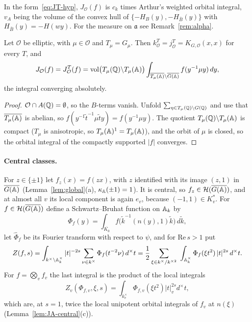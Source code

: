 In the form~\eqref{eq:JT-hyp}, $J_{\mathcal O}(f)$ is $c_k$ times Arthur's
weighted orbital integral, $v_A$ being the volume of the convex hull of
$\{-H_B(y),-H_{\bar B}(y)\}$ with $H_{\bar B}(y)=-H(wy)$. For the measure
on $\mathfrak a$ see Remark~\ref{rem:alpha}.

\begin{proposition}\label{prop:elliptic}
Let $\mathcal O$ be elliptic, with $\mu\in\mathcal O$ and $T_\mu=G_\mu$.
Then
$k^T_{\mathcal O}=j^T_{\mathcal O}=K_{G,\mathcal O}(x,x)$ for every $T$,
and
\[
J_{\mathcal O}(f)=J^T_{\mathcal O}(f)=\operatorname{vol}\bigl(T_\mu(\mathbb{Q})\backslash
T_\mu(\mathbb{A})\bigr)\int_{\overline{T_\mu(\mathbb{A})}\backslash\overline{G(\mathbb{A})}}f(y^{-1}\mu y)\,dy,
\]
the integral converging absolutely.
\end{proposition}

\begin{proof}
$\mathcal O\cap A(\mathbb{Q})=\emptyset$, so the $B$-terms vanish. Unfold
$\sum_{\eta\in T_\mu(\mathbb{Q})\backslash G(\mathbb{Q})}$ and use that
$\overline{T_\mu(\mathbb{A})}$ is abelian, so $f(y^{-1}\tilde t^{-1}\mu\tilde ty)=
f(y^{-1}\mu y)$. The quotient $T_\mu(\mathbb{Q})\backslash T_\mu(\mathbb{A})$ is compact
($T_\mu$ is anisotropic, so $T_\mu(\mathbb{A})^1=T_\mu(\mathbb{A})$), and the orbit of $\mu$ is closed, so the orbital
integral of the compactly supported $|f|$ converges.
\end{proof}

\paragraph{Central classes.} For $z\in\{\pm1\}$ let $f_z(x)=f(zx)$, with
$z$ identified with its image $(z,1)$ in $\overline{G(\mathbb{A})}$ (Lemma~\ref{lem:global}(a),
$\kappa_{\mathbb{A}}(\pm1)=1$). It is central, so $f_z\in\mathcal H(\overline{G(\mathbb{A})})$, and at
almost all $v$ its local component is again $e_v$, because $(-1,1)\in
K_v^*$. For $f\in\mathcal H(\overline{G(\mathbb{A})})$ define a Schwartz--Bruhat function on
$\mathbb{A}_k$ by
\begin{equation}\label{eq:Phi}
\Phi_f(y)=\int_{\overline{K_0}}f\bigl(\tilde k^{-1}(n(y),1)\tilde k\bigr)
\,d\tilde k,
\end{equation}
let $\hat\Phi_f$ be its Fourier transform with respect to $\psi$, and for
$\mathrm{Re}\,s>1$ put
\begin{equation}\label{eq:Zf}
Z(f,s)=\int_{k^\times\backslash\mathbb{A}_k^\times}|t|^{-2s}\sum_{\nu\in k^\times}
\Phi_f(t^{-2}\nu)\,d^\times t
=\frac12\sum_{\xi\in k^\times/k^{\times2}}\ \int_{\mathbb{A}_k^\times}
\Phi_f(\xi t^2)\,|t|^{2s}\,d^\times t .
\end{equation}
For $f=\bigotimes_vf_v$ the last integral is the product of the local
integrals
\[
Z_v(\Phi_{f,v},\xi,s)=\int_{k_v^\times}\Phi_{f,v}(\xi t^2)
|t|_v^{2s}d^\times t,
\]
which are, at $s=1$, twice the local unipotent orbital
integrals of $f_v$ at $n(\xi)$ (Lemma~\ref{lem:JA-central}(c)).


